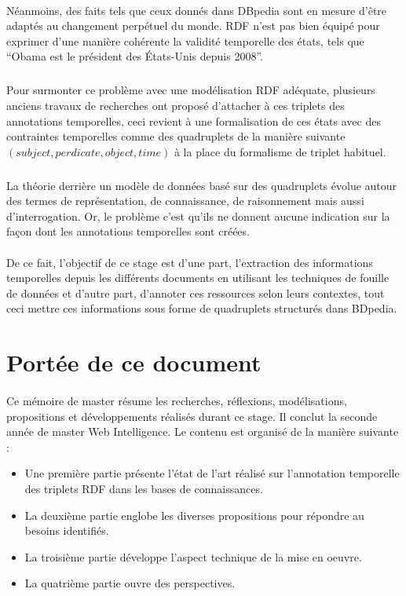 \paragraph{}
Néanmoins, des faits tels que ceux donnés dans DBpedia sont en mesure d’être adaptés au changement perpétuel du monde.
RDF n’est pas bien équipé pour exprimer d’une manière cohérente la validité temporelle des états, tels que “Obama est le président des États-Unis depuis 2008”. 
\subparagraph{}
Pour surmonter ce problème avec une modélisation RDF adéquate, plusieurs anciens travaux de recherches ont proposé d’attacher à ces triplets des annotations temporelles, ceci revient à une formalisation de ces états avec des contraintes temporelles comme des quadruplets de la manière suivante $(subject, perdicate, object, time)$ à la place du formalisme de triplet habituel.
\subparagraph{}
La théorie derrière un modèle de données basé sur des quadruplets évolue autour des termes de représentation, de connaissance, de raisonnement mais aussi d’interrogation. Or, le problème c’est qu’ils ne donnent aucune indication sur la façon dont les annotations temporelles sont créées.
\paragraph{}
De ce fait, l’objectif de ce stage est d’une part, l’extraction des informations temporelles depuis les différents documents en utilisant les techniques de fouille de données et d’autre part, d’annoter ces ressources selon leurs contextes, tout ceci mettre ces informations sous forme de quadruplets structurés dans BDpedia.
\newpage
\section*{Portée de ce document }
\paragraph{}
Ce mémoire de master résume les recherches, réflexions, modélisations, propositions et développements réalisés durant ce stage. Il conclut la seconde année de master Web Intelligence. Le contenu est organisé de la manière suivante :
\begin{itemize}
\item Une première partie présente l’état de l’art réalisé sur l’annotation temporelle des triplets RDF dans les bases de connaissances.
\item La deuxième partie englobe les diverses propositions pour répondre au besoins identifiés.
\item La troisième partie développe l’aspect technique de la mise en oeuvre.
\item La quatrième partie ouvre des perspectives.
\end{itemize}